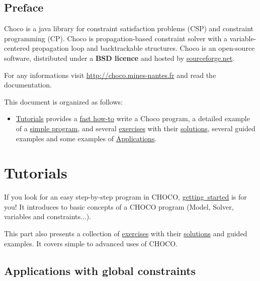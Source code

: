 \chapter*{Preface}
Choco is a java library for constraint satisfaction problems (CSP) and constraint programming (CP). 
Choco is propagation-based constraint solver with a variable-centered propagation loop and backtrackable structures.
Choco is an open-source software, distributed under a \textbf{BSD licence} and hosted by \href{http://sourceforge.net/projects/choco/}{sourceforge.net}.

For any informations visit \url{http://choco.mines-nantes.fr} and read the documentation.
\bigskip

\noindent This document is organized as follows:
\begin{itemize}
\item \hyperlink{ch:tut}{Tutorials} provides a \hyperlink{gettingstarted:gettingstarted:welcometochoco}{fast how-to} write a Choco program, a detailed example of a \hyperlink{gettingstarted:firstexample:magicsquare}{simple program}, and several \hyperlink{exercises}{exercises} with their \hyperlink{solutions}{solutions},  several guided examples  and some examples of \hyperlink{doc:applications}{Applications}.
\end{itemize}

\part{Tutorials}\label{ch:tut}\hypertarget{ch:tut}{}
If you look for an easy step-by-step program in CHOCO, \hyperlink{gettingstarted}{getting\ started} is for you! It introduces to basic concepts of a CHOCO program (Model, Solver, variables and constraints...).

This part also presents a collection of \hyperlink{exercises}{exercises} with their \hyperlink{solutions}{solutions} and guided examples. It covers simple to advanced uses of CHOCO.






\chapter{Applications with global constraints}\label{doc:applications}\hypertarget{doc:applications}{}

\pagebreak
